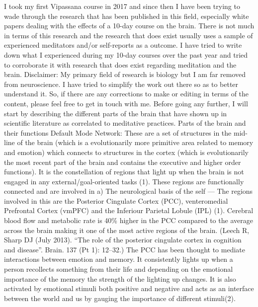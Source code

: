 \documentclass{article}
\begin{document}
I took my first Vipassana course in 2017 and since then I have been trying to wade through the research that has been published in this field, especially white papers dealing with the effects of a 10-day course on the brain. There is not much in terms of this research and the research that does exist usually uses a sample of experienced meditators and/or self-reports as a outcome. I have tried to write down what I experienced during my 10-day courses over the past year and tried to corroborate it with research that does exist regarding meditation and the brain.
Disclaimer: My primary field of research is biology but I am far removed from neuroscience. I have tried to simplify the work out there so as to better understand it. So, if there are any corrections to make or editing in terms of the content, please feel free to get in touch with me.
Before going any further, I will start by describing the different parts of the brain that have shown up in scientific literature as correlated to meditative practices.
Parts of the brain and their functions
Default Mode Network:
These are a set of structures in the mid-line of the brain (which is a evolutionarily more primitive area related to memory and emotion) which connects to structures in the cortex (which is evolutionarily the most recent part of the brain and contains the executive and higher order functions). It is the constellation of regions that light up when the brain is not engaged in any external/goal-oriented tasks (1). These regions are functionally connected and are involved in
a) The neurological basis of the self —
The regions involved in this are the Posterior Cingulate Cortex (PCC), venteromedial Prefrontal Cortex (vmPFC) and the Inferiour Parietal Lobule (IPL) (1).
Cerebral blood flow and metabolic rate is 40\% higher in the PCC compared to the average across the brain making it one of the most active regions of the brain. (Leech R, Sharp DJ (July 2013). “The role of the posterior cingulate cortex in cognition and disease”. Brain. 137 (Pt 1): 12–32.)
The PCC has been thought to mediate interactions between emotion and memory. It consistently lights up when a person recollects something from their life and depending on the emotional importance of the memory the strength of the lighting up changes. It is also activated by emotional stimuli both positive and negative and acts as an interface between the world and us by gauging the importance of different stimuli(2).
\end{document}
